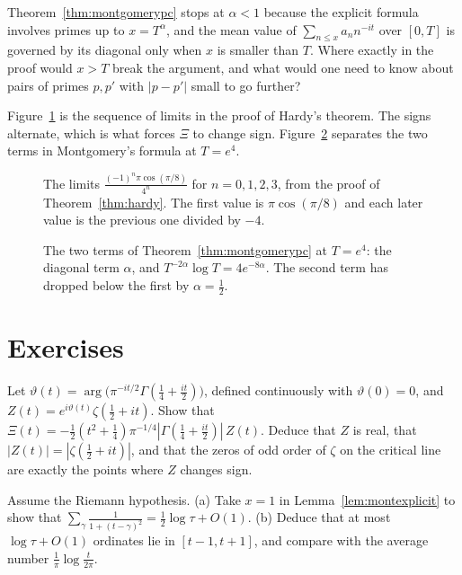 \begin{think}
Theorem~\ref{thm:montgomerypc} stops at $\alpha<1$ because the explicit formula involves primes up to $x=T^\alpha$, and the mean value of $\sum_{n\le x}a_nn^{-it}$ over $[0,T]$ is governed by its diagonal only when $x$ is smaller than $T$. Where exactly in the proof would $x>T$ break the argument, and what would one need to know about pairs of primes $p,p'$ with $|p-p'|$ small to go further?
\end{think}

Figure~\ref{fig:v14-extra-14-a} is the sequence of limits in the proof of Hardy's theorem. The signs alternate, which is what forces $\Xi$ to change sign. Figure~\ref{fig:v14-extra-14-b} separates the two terms in Montgomery's formula at $T=e^4$.

\begin{figure}[ht]
\centering
{}
\caption{The limits $\frac{(-1)^n\pi\cos(\pi/8)}{4^n}$ for $n=0,1,2,3$, from the proof of Theorem~\ref{thm:hardy}. The first value is $\pi\cos(\pi/8)$ and each later value is the previous one divided by $-4$.}
\label{fig:v14-extra-14-a}
\end{figure}

\begin{figure}[ht]
\centering
{}
\caption{The two terms of Theorem~\ref{thm:montgomerypc} at $T=e^4$: the diagonal term $\alpha$, and $T^{-2\alpha}\log T=4e^{-8\alpha}$. The second term has dropped below the first by $\alpha=\frac12$.}
\label{fig:v14-extra-14-b}
\end{figure}

\section{Exercises}

\begin{exercise}[$\star$]\label{ex:zreal}
Let $\vartheta(t)=\arg\bigl(\pi^{-it/2}\Gamma(\frac14+\frac{it}2)\bigr)$, defined continuously with $\vartheta(0)=0$, and $Z(t)=e^{i\vartheta(t)}\zeta(\frac12+it)$. Show that $\Xi(t)=-\frac12(t^2+\frac14)\pi^{-1/4}|\Gamma(\frac14+\frac{it}2)|\,Z(t)$. Deduce that $Z$ is real, that $|Z(t)|=|\zeta(\frac12+it)|$, and that the zeros of odd order of $\zeta$ on the critical line are exactly the points where $Z$ changes sign.
\end{exercise}

\begin{exercise}[$\star$]\label{ex:sumgamma}
Assume the Riemann hypothesis. (a) Take $x=1$ in Lemma~\ref{lem:montexplicit} to show that $\sum_\gamma\frac1{1+(t-\gamma)^2}=\frac12\log\tau+O(1)$. (b) Deduce that at most $\log\tau+O(1)$ ordinates lie in $[t-1,t+1]$, and compare with the average number $\frac1\pi\log\frac t{2\pi}$.
\end{exercise}

